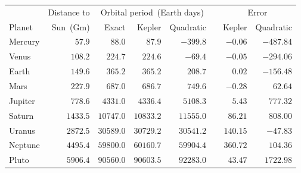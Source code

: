 \begin{tabular}{lrrrrrrr} \toprule
        & Distance to & \multicolumn{3}{c}{Orbital period~(Earth days)} && \multicolumn{2}{c}{Error} \\
  \cmidrule{3-5} \cmidrule{7-8}
Planet  & Sun~(Gm)    & Exact     & Kepler    & Quadratic && Kepler   & Quadratic \\\midrule
Mercury & $57.9$      & $88.0$    & $87.9$    & $-399.8$  && $-0.06$  & $-487.84$ \\[4pt]
Venus   & $108.2$     & $224.7$   & $224.6$   & $-69.4$   && $-0.05$  & $-294.06$ \\[4pt]
Earth   & $149.6$     & $365.2$   & $365.2$   & $208.7$   && $0.02$   & $-156.48$ \\[4pt]
Mars    & $227.9$     & $687.0$   & $686.7$   & $749.6$   && $-0.28$  & $62.64$   \\[4pt]
Jupiter & $778.6$     & $4331.0$  & $4336.4$  & $5108.3$  && $5.43$   & $777.32$  \\[4pt]
Saturn  & $1433.5$    & $10747.0$ & $10833.2$ & $11555.0$ && $86.21$  & $808.00$  \\[4pt]
Uranus  & $2872.5$    & $30589.0$ & $30729.2$ & $30541.2$ && $140.15$ & $-47.83$  \\[4pt]
Neptune & $4495.4$    & $59800.0$ & $60160.7$ & $59904.4$ && $360.72$ & $104.36$  \\[4pt]
Pluto   & $5906.4$    & $90560.0$ & $90603.5$ & $92283.0$ && $43.47$  & $1722.98$ \\\bottomrule
\end{tabular}
